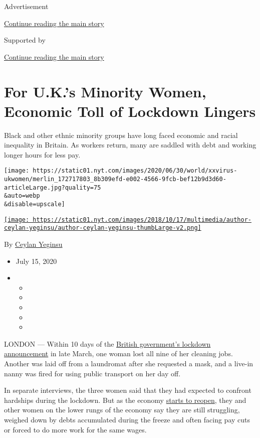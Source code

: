 Advertisement

\protect\hyperlink{after-top}{Continue reading the main story}

Supported by

\protect\hyperlink{after-sponsor}{Continue reading the main story}

\hypertarget{for-uks-minority-women-economic-toll-of-lockdown-lingers}{%
\section{For U.K.'s Minority Women, Economic Toll of Lockdown
Lingers}\label{for-uks-minority-women-economic-toll-of-lockdown-lingers}}

Black and other ethnic minority groups have long faced economic and
racial inequality in Britain. As workers return, many are saddled with
debt and working longer hours for less pay.

\texttt{[image: https://static01.nyt.com/images/2020/06/30/world/xxvirus-ukwomen/merlin\_172717803\_8b309efd-e002-4566-9fcb-bef12b9d3d60-articleLarge.jpg?quality=75\\\&auto=webp\\\&disable=upscale]}

\href{https://www.nytimes.com/by/ceylan-yeginsu}{\texttt{[image: https://static01.nyt.com/images/2018/10/17/multimedia/author-ceylan-yeginsu/author-ceylan-yeginsu-thumbLarge-v2.png]}}

By \href{https://www.nytimes.com/by/ceylan-yeginsu}{Ceylan Yeginsu}

\begin{itemize}
\item
  July 15, 2020
\item
  \begin{itemize}
  \item
  \item
  \item
  \item
  \item
  \end{itemize}
\end{itemize}

LONDON --- Within 10 days of the
\href{https://www.nytimes.com/2020/03/24/world/europe/britain-coronavirus-lockdown.html}{British
government's lockdown announcement} in late March, one woman lost all
nine of her cleaning jobs. Another was laid off from a laundromat after
she requested a mask, and a live-in nanny was fired for using public
transport on her day off.

In separate interviews, the three women said that they had expected to
confront hardships during the lockdown. But as the economy
\href{https://www.nytimes.com/2020/05/11/world/europe/coronavirus-uk-boris-johnson.html}{starts
to reopen}, they and other women on the lower rungs of the economy say
they are still struggling, weighed down by debts accumulated during the
freeze and often facing pay cuts or forced to do more work for the same
wages.

